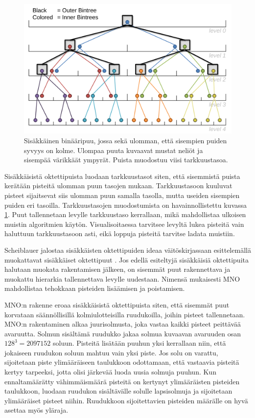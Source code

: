 \begin{figure}
    \centering
    \includegraphics[width=0.6\paperwidth]{img/nested.png}
    \caption{Sisäkkäinen binääripuu, jossa sekä ulomman, että sisempien puiden syvyys on kolme. Ulompaa puuta kuvaavat mustat neliöt ja sisempää värikkäät ympyrät. Puista muodostuu viisi tarkkuustasoa. \cite{scheiblauer}}
    \label{nested}
\end{figure}

Sisäkkäisistä oktettipuista luodaan tarkkuustasot siten, että sisemmistä puista kerätään pisteitä ulomman puun tasojen mukaan. Tarkkuustasoon kuuluvat pisteet sijaitsevat siis ulomman puun samalla tasolla, mutta useiden sisempien puiden eri tasoilla. Tarkkuustasojen muodostumista on havainnollistettu kuvassa \ref{nested}. Puut tallennetaan levylle tarkkuustaso kerrallaan, mikä mahdollistaa ulkoisen muistin algoritmien käytön. Visualisoitaessa tarvitsee levyltä lukea pisteitä vain haluttuun tarkkuustasoon asti, eikä loppuja pisteitä tarvitse ladata muistiin. \cite{ip}

Scheiblauer jalostaa sisäkkäisten oktettipuiden ideaa väitöskirjassaan esittelemällä muokattavat sisäkkäiset oktettipuut . Jos edellä esiteltyjä sisäkkäisiä oktettipuita halutaan muokata rakentamisen jälkeen, on sisemmät puut rakennettava ja muokattu hierarkia tallennettava levylle uudestaan. Nimensä mukaisesti MNO mahdollistaa tehokkaan pisteiden lisäämisen ja poistamisen. \cite{scheiblauer} 

MNO:n rakenne eroaa sisäkkäisistä oktettipuista siten, että sisemmät puut korvataan säännöllisillä kolmiulotteisilla ruudukoilla, joihin pisteet tallennetaan. MNO:n rakentaminen alkaa juurisolmusta, joka vastaa kaikki pisteet peittävää avaruutta. Solmun sisältämä ruudukko jakaa solmua kuvaavan avaruuden osan $128^3 = 2 097 152$ soluun. Pisteitä lisätään puuhun yksi kerrallaan niin, että jokaiseen ruudukon soluun mahtuu vain yksi piste. Jos solu on varattu, sijoitetaan piste ylimääräiseen taulukkoon odottamaan, että vastaavia pisteitä kertyy tarpeeksi, jotta olisi järkevää luoda uusia solmuja puuhun. Kun ennaltamäärätty vähimmäismäärä pisteitä on kertynyt ylimääräisten pisteiden taulukkoon, luodaan ruudukon sisältävälle solulle lapsisolmuja ja sijoitetaan ylimääräiset pisteet niihin. Ruudukkoon sijoitettavien pisteiden määrälle on hyvä asettaa myös yläraja. \cite{scheiblauer}

